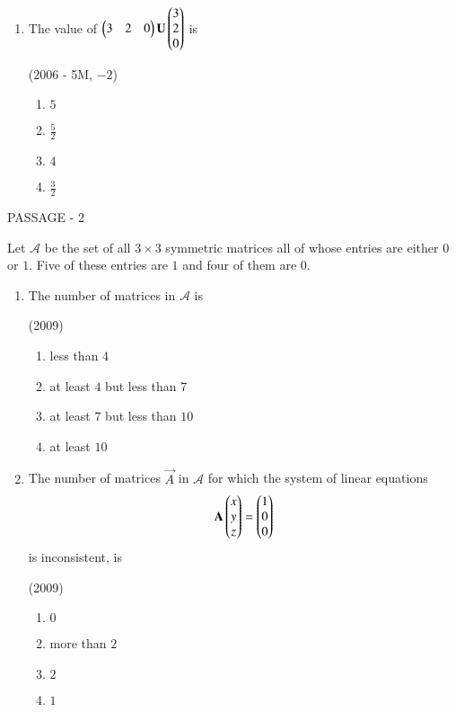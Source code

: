 \documentclass[journal,12pt,onecolumn]{IEEEtran}
\theoremstyle{remark}
\begin{document}
\begin{multicols}{2}
\begin{enumerate}
		\item The value of $\begin{pmatrix} 3 & 2 & 0 \end{pmatrix}
				\mathbf{U}
				\begin{pmatrix} 3 \\ 2 \\ 0 \end{pmatrix}$ is

			\hfill(2006 - 5M, $-2$)
			\begin{enumerate}
				\item $5$
				\item $\frac{5}{2}$
				\item $4$
				\item $\frac{3}{2}$
			\end{enumerate}
	\end{enumerate}

	\bigskip

	{\centering PASSAGE - 2 \par}

	\bigskip

	Let $\mathcal{A}$ be the set of all $3\times3$ symmetric matrices all of whose entries are either $0$ or $1$. Five of these entries are $1$ and four of them are $0$.

	\begin{enumerate}
		\item The number of matrices in $\mathcal{A}$ is

			\hfill(2009)

			\begin{enumerate}
				\item less than $4$
				\item at least $4$ but less than $7$
				\item at least $7$ but less than $10$
				\item at least $10$
			\end{enumerate}

		\item The number of matrices $\vec{A}$ in $\mathcal{A}$ for which the system of linear equations
			$$\mathbf{A}\begin{pmatrix}x \\ y \\ z\end{pmatrix}=\begin{pmatrix}1 \\ 0 \\ 0\end{pmatrix}$$
			is inconsistent, is

			\hfill(2009)

			\begin{enumerate}
				\item $0$
				\item more than $2$
				\item $2$
				\item $1$
			\end{enumerate}
	\end{enumerate}


\end{multicols}
\end{document}
